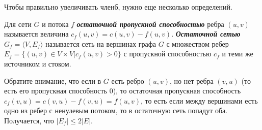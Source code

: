 Чтобы правильно увеличивать членб, нужно еще несколько определений.
\begin{definition}
	Для сети $G$ и потока $f$ {\bf\it остаточной пропускной способностью} ребра $(u,v)$ называется величина $c_f(u,v)=c(u,v)-f(u,v)$. {\bf\it Остаточной сетью} $G_f=\langle V,E_f\rangle$ называется сеть на вершинах графа $G$ с множеством ребер $E_f=\{(u,v)\in V\times V|c_f(u,v)>0\}$ с пропускной способностью $c_f$ и теми же источником и стоком.
\end{definition}
Обратите внимание, что если в $G$ есть ребро $(u,v)$, но нет ребра $(v,u)$ (то есть его пропускная способность 0), то остаточная пропускная способность $c_f(v,u)=c(v,u)-f(v,u)=f(u,v)$, то есть если между вершинами есть одно из ребер с ненулевым потоком, то в остаточную сеть попадут оба.
Получается, что $|E_f|\le 2|E|$.

